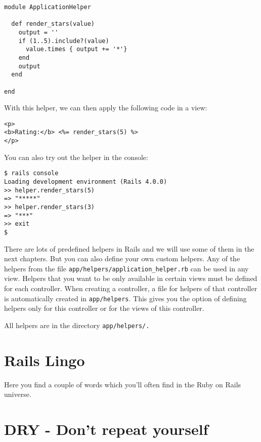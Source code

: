 \documentclass[a4paper]{book}
\begin{document}
\begin{shaded}\begin{verbatim}
module ApplicationHelper

  def render_stars(value)
    output = ''
    if (1..5).include?(value)
      value.times { output += '*'}
    end
    output
  end

end
\end{verbatim}\end{shaded}

With this helper, we can then apply the following code in a view:

\begin{shaded}\begin{verbatim}
<p>
<b>Rating:</b> <%= render_stars(5) %>
</p>
\end{verbatim}\end{shaded}

You can also try out the helper in the console:

\begin{shaded}\begin{verbatim}
$ rails console
Loading development environment (Rails 4.0.0)
>> helper.render_stars(5)
=> "*****"
>> helper.render_stars(3)
=> "***"
>> exit
$
\end{verbatim}\end{shaded}

There are lots of predefined helpers in Rails and we will use some of them in the next chapters. But you can also define your own custom helpers. Any of the helpers from the file \texttt{app/helpers/application\_helper.rb} can be used in any view. Helpers that you want to be only available in certain views must be defined for each controller. When creating a controller, a file for helpers of that controller is automatically created in \texttt{app/helpers}. This gives you the option of defining helpers only for this controller or for the views of this controller.

All helpers are in the directory \texttt{app/helpers/.}

\section{Rails Lingo}\label{rails-lingo}

Here you find a couple of words which you'll often find in the Ruby on Rails universe.

\section{DRY - Don't repeat yourself}\label{dry---dont-repeat-yourself}
\end{document}
